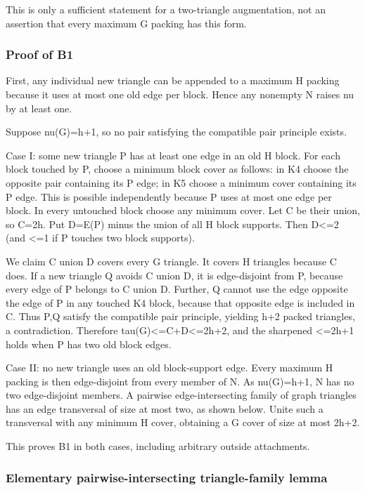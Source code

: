\documentclass[11pt]{article}
\begin{document}
This is only a sufficient statement for a two-triangle augmentation, not an assertion that every maximum G packing has this form.

\subsubsection{Proof of B1}\label{proof-of-b1}

First, any individual new triangle can be appended to a maximum H packing because it uses at most one old edge per block. Hence any nonempty N raises nu by at least one.

Suppose nu(G)=h+1, so no pair satisfying the compatible pair principle exists.

Case I: some new triangle P has at least one edge in an old H block. For each block touched by P, choose a minimum block cover as follows: in K4 choose the opposite pair containing its P edge; in K5 choose a minimum cover containing its P edge. This is possible independently because P uses at most one edge per block. In every untouched block choose any minimum cover. Let C be their union, so \textbar C\textbar=2h. Put D=E(P) minus the union of all H block supports. Then \textbar D\textbar\textless=2 (and \textless=1 if P touches two block supports).

We claim C union D covers every G triangle. It covers H triangles because C does. If a new triangle Q avoids C union D, it is edge-disjoint from P, because every edge of P belongs to C union D. Further, Q cannot use the edge opposite the edge of P in any touched K4 block, because that opposite edge is included in C. Thus P,Q satisfy the compatible pair principle, yielding h+2 packed triangles, a contradiction. Therefore tau(G)\textless=\textbar C\textbar+\textbar D\textbar\textless=2h+2, and the sharpened \textless=2h+1 holds when P has two old block edges.

Case II: no new triangle uses an old block-support edge. Every maximum H packing is then edge-disjoint from every member of N. As nu(G)=h+1, N has no two edge-disjoint members. A pairwise edge-intersecting family of graph triangles has an edge transversal of size at most two, as shown below. Unite such a transversal with any minimum H cover, obtaining a G cover of size at most 2h+2.

This proves B1 in both cases, including arbitrary outside attachments.

\subsubsection{Elementary pairwise-intersecting triangle-family lemma}\label{elementary-pairwise-intersecting-triangle-family-lemma}
\end{document}
